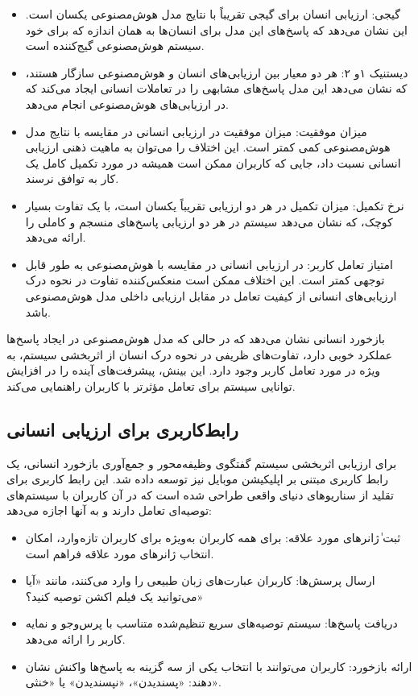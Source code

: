 \begin{itemize}
\item
گیجی: ارزیابی انسان برای گیجی تقریباً با نتایج مدل هوش‌مصنوعی یکسان است.
این نشان می‌دهد که پاسخ‌های این مدل برای انسان‌ها به همان اندازه که برای خود سیستم هوش‌مصنوعی گیج‌کننده است.
\item
دیستنیک ۱و ۲: هر دو معیار بین ارزیابی‌های انسان و هوش‌مصنوعی سازگار هستند، که نشان می‌دهد این مدل پاسخ‌های مشابهی را در تعاملات انسانی ایجاد می‌کند که در ارزیابی‌های هوش‌مصنوعی انجام می‌دهد.
\item
میزان موفقیت: میزان موفقیت در ارزیابی انسانی در مقایسه با نتایج مدل هوش‌مصنوعی کمی کمتر است. این اختلاف را می‌توان به ماهیت ذهنی ارزیابی انسانی نسبت داد، جایی که کاربران ممکن است همیشه در مورد تکمیل کامل یک کار به توافق نرسند.
\item
نرخ تکمیل: میزان تکمیل در هر دو ارزیابی تقریباً یکسان است، با یک تفاوت بسیار کوچک، که نشان می‌دهد سیستم در هر دو ارزیابی پاسخ‌های منسجم و کاملی را ارائه می‌دهد.
\item
 امتیاز تعامل کاربر: در ارزیابی انسانی در مقایسه با هوش‌مصنوعی به طور قابل ‌توجهی کمتر است. این اختلاف ممکن است منعکس‌کننده تفاوت در نحوه درک ارزیابی‌های انسانی از کیفیت تعامل در مقابل ارزیابی داخلی مدل هوش‌مصنوعی باشد.
\end{itemize}

بازخورد انسانی نشان می‌دهد که در حالی که مدل هوش‌مصنوعی در ایجاد پاسخ‌ها عملکرد خوبی دارد، تفاوت‌های ظریفی در نحوه درک انسان از اثربخشی سیستم، به ویژه در مورد تعامل کاربر وجود دارد. این بینش، پیشرفت‌های آینده را در افزایش توانایی سیستم برای تعامل مؤثرتر با کاربران راهنمایی می‌کند.

\subsection{رابط‌کاربری برای ارزیابی انسانی}

برای ارزیابی اثربخشی سیستم گفتگوی وظیفه‌محور و جمع‌آوری بازخورد انسانی، یک رابط کاربری مبتنی بر اپلیکیشن موبایل نیز توسعه داده شد. این رابط کاربری برای تقلید از سناریوهای دنیای واقعی طراحی شده است که در آن کاربران با سیستم‌های توصیه‌ای تعامل دارند و به آنها اجازه می‌دهد:
\begin{itemize}
\item
ثبت ٰژانرهای مورد علاقه: برای همه کاربران به‌ویژه برای کاربران تازه وارد، امکان انتخاب ژانرهای مورد علاقه فراهم است.
\item
 ارسال پرسش‌ها: کاربران عبارت‌های زبان طبیعی را وارد می‌کنند، مانند «آیا می‌توانید یک فیلم اکشن توصیه کنید؟»
\item
 دریافت پاسخ‌ها: سیستم توصیه‌های سریع تنظیم‌شده متناسب با پرس‌و‌جو و نمایه کاربر را ارائه می‌دهد.
\item
 ارائه بازخورد: کاربران می‌توانند با انتخاب یکی از سه گزینه به پاسخ‌ها واکنش نشان دهند: «پسندیدن»، «نپسندیدن» یا «خنثی».
\end{itemize}

